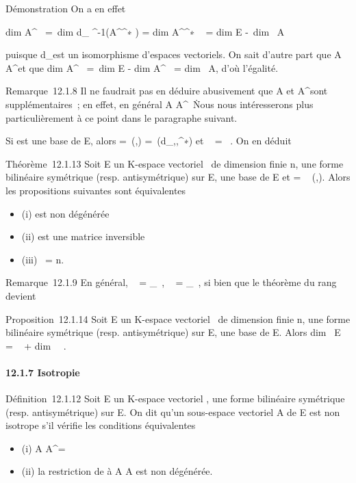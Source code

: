 \documentclass[]{article}
\begin{document}
Démonstration On a en effet

dim A^\bot~ =\
dim d\_ \phi^-1(A^\bot^∗ )
= dim A^\bot^∗ ~
= dim E -\ dim~ A

puisque d\_\phi est un isomorphisme d'espaces vectoriels. On sait
d'autre part que A \subset~ A^\bot\bot et que
dim A^\bot\bot~ =\
dim E - dim A^\bot~
= dim~ A, d'où l'égalité.

Remarque~12.1.8 Il ne faudrait pas en déduire abusivement que A et
A^\bot sont supplémentaires~; en effet, en général A \bigcap
A^\bot\neq~\0\.
Nous nous intéresserons plus particulièrement à ce point dans le
paragraphe suivant.

Si  est une base de E, alors \Omega =\
\mathrmMat (\phi,) =\
\mathrmMat (d\_\phi,,^∗) et
\mathrmrg~\phi
= \mathrmrg~\Omega. On en déduit

Théorème~12.1.13 Soit E un K-espace vectoriel ~de dimension finie n, \phi
une forme bilinéaire symétrique (resp. antisymétrique) sur E,  une base
de E et \Omega = \mathrmMat~
(\phi,). Alors les propositions suivantes sont équivalentes

\begin{itemize}
\itemsep1pt\parskip0pt
\item
  (i) \phi est non dégénérée
\item
  (ii) \Omega est une matrice inversible
\item
  (iii) \mathrmrg~\phi = n.
\end{itemize}

Remarque~12.1.9 En général,
\mathrmKer~\phi
= \mathrmKerd\_\phi~,
\mathrmrg~\phi
= \mathrmrgd\_\phi~, si
bien que le théorème du rang devient

Proposition~12.1.14 Soit E un K-espace vectoriel ~de dimension finie n,
\phi une forme bilinéaire symétrique (resp. antisymétrique) sur E,  une
base de E. Alors dim~ E
= \mathrmrg~\phi
+ dim~
\mathrmKer~\phi.

\paragraph{12.1.7 Isotropie}

Définition~12.1.12 Soit E un K-espace vectoriel , \phi une forme bilinéaire
symétrique (resp. antisymétrique) sur E. On dit qu'un sous-espace
vectoriel A de E est non isotrope s'il vérifie les conditions
équivalentes

\begin{itemize}
\itemsep1pt\parskip0pt\parsep0pt
\item
  (i) A \bigcap A^\bot = \0\
\item
  (ii) la restriction de \phi à A \times A est non dégénérée.
\end{itemize}
\end{document}
